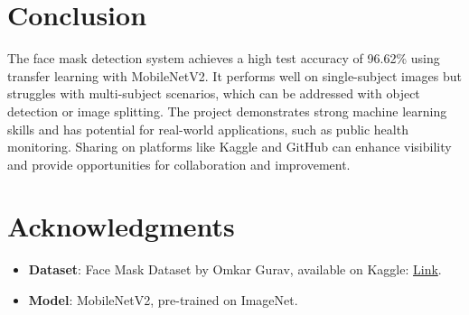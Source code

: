 \documentclass[a4paper,12pt]{article}
\begin{document}
\section{Conclusion}
The face mask detection system achieves a high test accuracy of 96.62\% using transfer learning with MobileNetV2. It performs well on single-subject images but struggles with multi-subject scenarios, which can be addressed with object detection or image splitting. The project demonstrates strong machine learning skills and has potential for real-world applications, such as public health monitoring. Sharing on platforms like Kaggle and GitHub can enhance visibility and provide opportunities for collaboration and improvement.

\section*{Acknowledgments}
\begin{itemize}
    \item \textbf{Dataset}: Face Mask Dataset by Omkar Gurav, available on Kaggle: \href{https://www.kaggle.com/datasets/omkargurav/face-mask-dataset}{Link}.
    \item \textbf{Model}: MobileNetV2, pre-trained on ImageNet.
\end{itemize}
\end{document}
